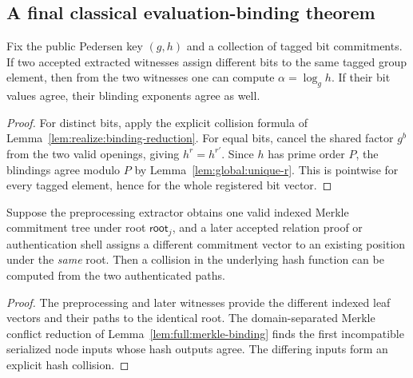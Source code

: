 \subsection{A final classical evaluation-binding theorem}\label{sec:security14:soundness}

\begin{lemma}\label{lem:security14:canonical}
Fix the public Pedersen key $(g,h)$ and a collection
of tagged bit commitments. If two accepted
extracted witnesses assign different bits to
the same tagged group element, then from the
two witnesses one can compute $\alpha=\log_g h$.
If their bit values agree, their blinding
exponents agree as well.
\end{lemma}
\begin{proof}
For distinct bits, apply the explicit
collision formula of
Lemma~\ref{lem:realize:binding-reduction}.
For equal bits, cancel the shared
factor $g^b$ from the two
valid openings, giving
$h^r=h^{r'}$. Since $h$
has prime order $P$, the
blindings agree modulo $P$ by
Lemma~\ref{lem:global:unique-r}.
This is pointwise for every
tagged element, hence for the
whole registered bit vector.
\end{proof}

\begin{lemma}\label{lem:security14:same-root}
Suppose the preprocessing extractor
obtains one valid indexed Merkle
commitment tree under root
$\mathsf{root}_j$, and a later
accepted relation proof or
authentication shell assigns
a different commitment vector
to an existing position under
the \emph{same} root.
Then a collision in the
underlying hash function can
be computed from the two
authenticated paths.
\end{lemma}
\begin{proof}
The preprocessing and later
witnesses provide the
different indexed leaf vectors
and their paths to the identical
root. The domain-separated
Merkle conflict reduction of
Lemma~\ref{lem:full:merkle-binding}
finds the first incompatible
serialized node inputs whose
hash outputs agree.
The differing inputs form
an explicit hash collision.
\end{proof}

